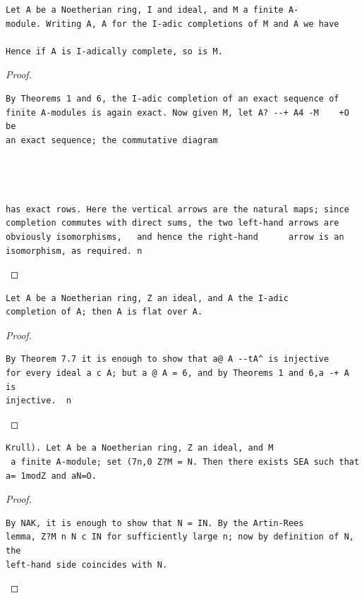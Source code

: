 \begin{theorem}\label{mcrt-auto-theorem-8-7}\uses{}
\begin{verbatim}
Let A be a Noetherian ring, I and ideal, and M a finite A-
module. Writing A, A for the I-adic completions of M and A we have

Hence if A is I-adically complete, so is M.
\end{verbatim}
\end{theorem}
\begin{proof}
\begin{verbatim}
By Theorems 1 and 6, the I-adic completion of an exact sequence of
finite A-modules is again exact. Now given M, let A? --+ A4 -M    +O be
an exact sequence; the commutative diagram




has exact rows. Here the vertical arrows are the natural maps; since
completion commutes with direct sums, the two left-hand arrows are
obviously isomorphisms,   and hence the right-hand      arrow is an
isomorphism, as required. n
\end{verbatim}
\end{proof}


\begin{theorem}\label{mcrt-auto-theorem-8-8}\uses{}
\begin{verbatim}
Let A be a Noetherian ring, Z an ideal, and A the I-adic
completion of A; then A is flat over A.
\end{verbatim}
\end{theorem}
\begin{proof}
\begin{verbatim}
By Theorem 7.7 it is enough to show that a@ A --tA^ is injective
for every ideal a c A; but a @ A = 6, and by Theorems 1 and 6,a -+ A is
injective.  n
\end{verbatim}
\end{proof}


\begin{theorem}\label{mcrt-auto-theorem-8-9}\uses{}
\begin{verbatim}
Krull). Let A be a Noetherian ring, Z an ideal, and M
 a finite A-module; set (7n,0 Z?M = N. Then there exists SEA such that
a= 1modZ and aN=O.
\end{verbatim}
\end{theorem}
\begin{proof}
\begin{verbatim}
By NAK, it is enough to show that N = IN. By the Artin-Rees
lemma, Z?M n N c IN for sufficiently large n; now by definition of N, the
left-hand side coincides with N.
\end{verbatim}
\end{proof}


